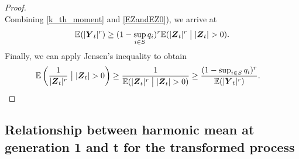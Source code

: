 \documentclass[preprint,3p,12pt]{elsarticle}
\theoremstyle{definition}
\begin{document}
\begin{proof}
\begin{equation}
        \end{equation}
        Combining \eqref{k_th_moment} and \eqref{EZandEZ0}), we arrive at
        \begin{equation*}
            \mathbb{E}(|\boldsymbol{Y}_t|^{r})   \ge (1-\sup_{i \in S}q_i)^{r} \mathbb{E}(|\boldsymbol{Z}_t|^{r}\bigm| |\boldsymbol{Z}_t| > 0).  \label{denominator}
        \end{equation*}
        Finally, we can apply Jensen's inequality to obtain %
    \begin{align*}
        \mathbb{E}\left(\frac{1}{|\boldsymbol{Z}_t|^{r}}\bigm| |\boldsymbol{Z}_t| > 0\right) %
        & \ge \frac{1}{\mathbb{E}(|\boldsymbol{Z}_t|^{r}\bigm| |\boldsymbol{Z}_t| > 0)}  %
         \ge \frac{(1-\sup_{i \in S}q_i)^{r}}{\mathbb{E}(|\boldsymbol{Y}_t|^{r})}. \label{just_above}
    \end{align*}
\end{proof}
\subsection{Relationship between harmonic mean at generation 1 and t for the transformed process}
\end{document}
